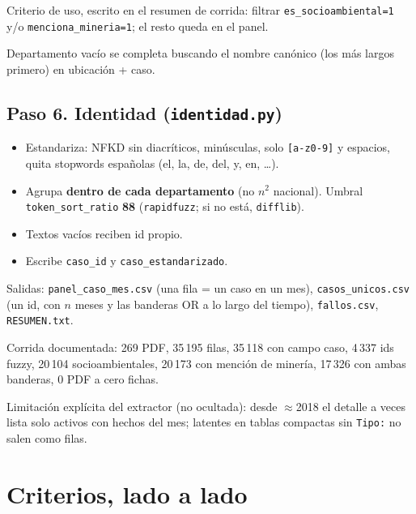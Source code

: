 \documentclass[11pt,a4paper]{article}
\begin{document}
Criterio de uso, escrito en el resumen de corrida: filtrar \texttt{es\_socioambiental=1} y/o \texttt{menciona\_mineria=1}; el resto queda en el panel.

Departamento vacío se completa buscando el nombre canónico (los más largos primero) en ubicación + caso.

\subsection{Paso 6. Identidad (\texttt{identidad.py})}

\begin{itemize}
  \item Estandariza: NFKD sin diacríticos, minúsculas, solo \texttt{[a-z0-9]} y espacios, quita stopwords españolas (el, la, de, del, y, en, \ldots).
  \item Agrupa \textbf{dentro de cada departamento} (no $n^2$ nacional). Umbral \texttt{token\_sort\_ratio} \textbf{88} (\texttt{rapidfuzz}; si no está, \texttt{difflib}).
  \item Textos vacíos reciben id propio.
  \item Escribe \texttt{caso\_id} y \texttt{caso\_estandarizado}.
\end{itemize}

Salidas: \texttt{panel\_caso\_mes.csv} (una fila = un caso en un mes), \texttt{casos\_unicos.csv} (un id, con $n$ meses y las banderas OR a lo largo del tiempo), \texttt{fallos.csv}, \texttt{RESUMEN.txt}.

Corrida documentada: 269 PDF, 35\,195 filas, 35\,118 con campo caso, 4\,337 ids fuzzy, 20\,104 socioambientales, 20\,173 con mención de minería, 17\,326 con ambas banderas, 0 PDF a cero fichas.

Limitación explícita del extractor (no ocultada): desde $\approx$2018 el detalle a veces lista solo activos con hechos del mes; latentes en tablas compactas sin \texttt{Tipo:} no salen como filas.

\section{Criterios, lado a lado}
\end{document}
